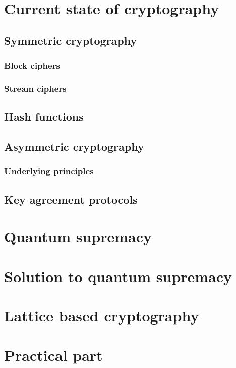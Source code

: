 \chapter{Current state of cryptography}
\label{ch:state_of_crypto}


\section{Symmetric cryptography}
\label{sec:symmetric_enc}


\subsection{Block ciphers}
\label{subsec:block_ciphers}


\subsection{Stream ciphers}
\label{subsec:stream_ciphers}


\section{Hash functions}
\label{sec:hash_functions}


\section{Asymmetric cryptography}
\label{sec:asymmetric_enc}


\subsection{Underlying principles}
\label{subsec:underlying_principles}


\section{Key agreement protocols}
\label{sec:key_agreement}


\chapter{Quantum supremacy}
\label{ch:quantum_supr}


\chapter{Solution to quantum supremacy}


\chapter{Lattice based cryptography}


\chapter{Practical part}


